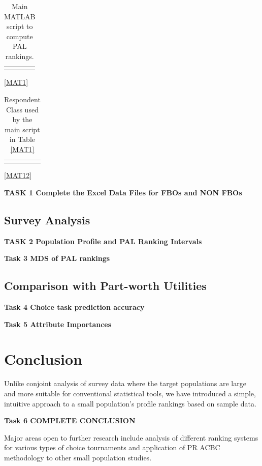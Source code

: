 \documentclass[a4paper, 12pt]{article}
\begin{document}
\begin{table}[!htbp]
	\flushleft
	\begin{tabular}{|l|}\toprule
		\parbox[b]{6.25in}{}\\\bottomrule
	\end{tabular}
\caption{Main MATLAB script to compute PAL rankings.}
	\ref{MAT1}
\end{table}

\begin{table}[!htpb]
	\flushleft
	\begin{tabular}{|l|}\toprule
		\parbox[b]{6.25in}{}\\\bottomrule
	\end{tabular}
	\caption{Respondent Class used by the main script in Table \ref{MAT1}}
		\ref{MAT12}
	\end{table}

\newpage


{\bf TASK 1 Complete the Excel Data Files for FBOs and NON FBOs}


\subsection{Survey Analysis}

{\bf TASK 2 Population Profile and PAL Ranking Intervals}



{\bf Task 3 MDS of PAL rankings }


\subsection{Comparison with Part-worth Utilities}

{\bf Task 4 Choice task prediction accuracy}

{\bf Task 5 Attribute Importances}




\section{Conclusion}
Unlike conjoint analysis of survey data where the target populations are large and more suitable for conventional statistical tools, we have introduced a simple, intuitive approach to a small population's profile rankings based on sample data. 

{\bf Task 6 COMPLETE CONCLUSION}

Major areas open to further research include analysis of  different ranking systems for various types of choice tournaments and application of PR ACBC methodology to other small population studies.
\end{document}

